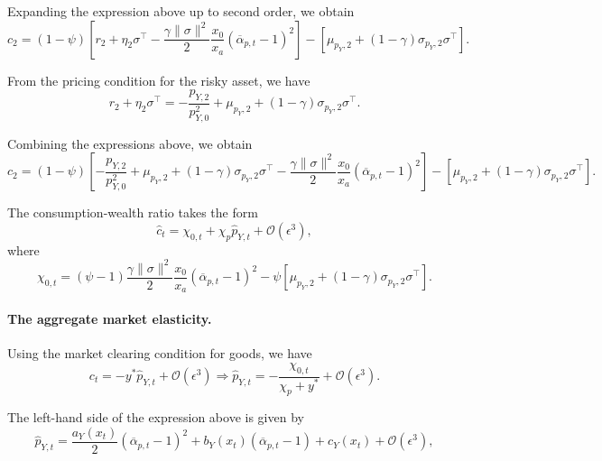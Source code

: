 Expanding the expression above up to second order, we obtain
\begin{equation}
    c_{2} = (1-\psi) \left[ r_2 + \eta_2 \sigma^\top - \frac{\gamma\|\sigma\|^2}{2} \frac{x_0}{x_a}(\overline{\alpha}_{p,t}-1)^2 \right] - \left[\mu_{p_Y,2} + (1-\gamma) \sigma_{p_Y,2} \sigma^\top \right].
\end{equation}

From the pricing condition for the risky asset, we have
\begin{equation}
    r_2 + \eta_2 \sigma^\top = - \frac{p_{Y,2}}{p_{Y,0}^2}  + \mu_{p_Y,2} + (1-\gamma) \sigma_{p_Y,2} \sigma^\top.
\end{equation}

Combining the expressions above, we obtain
\begin{equation}
    c_{2} = (1-\psi) \left[ - \frac{p_{Y,2}}{p_{Y,0}^2}  + \mu_{p_Y,2} + (1-\gamma) \sigma_{p_Y,2} \sigma^\top - \frac{\gamma\|\sigma\|^2}{2} \frac{x_0}{x_a}(\overline{\alpha}_{p,t}-1)^2 \right] - \left[\mu_{p_Y,2} + (1-\gamma) \sigma_{p_Y,2} \sigma^\top \right].
\end{equation}

The consumption-wealth ratio takes the form
\begin{equation}
    \hat{c}_{t} = \chi_{0,t} + \chi_p \hat{p}_{Y,t} + \mathcal{O}(\epsilon^3),
\end{equation}
where
\begin{equation}    
    \chi_{0,t} = (\psi-1) \frac{\gamma\|\sigma\|^2}{2} \frac{x_0}{x_a}(\overline{\alpha}_{p,t}-1)^2 - \psi \left[ \mu_{p_Y,2} + (1-\gamma) \sigma_{p_Y,2} \sigma^\top \right].
\end{equation}

\paragraph{The aggregate market elasticity.} 
Using the market clearing condition for goods, we have
\begin{equation}
    c_t = - y^* \hat{p}_{Y,t} + \mathcal{O}(\epsilon^3) \Rightarrow \hat{p}_{Y,t} = - \frac{\chi_{0,t}}{\chi_p + y^*} + \mathcal{O}(\epsilon^3).
\end{equation}

The left-hand side of the expression above is given by
\begin{equation}
    \hat{p}_{Y,t} =  \frac{a_{Y}(x_t)}{2}(\overline{\alpha}_{p,t}-1)^2 + b_{Y}(x_t) (\overline{\alpha}_{p,t}-1) + c_{Y}(x_t)+ \mathcal{O}(\epsilon^3),
\end{equation}

